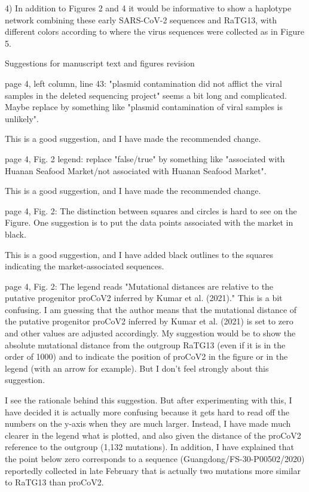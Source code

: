 \documentclass[11pt, oneside]{article}   	%
\newcommand{\response}[1]{{\color{black}#1}}
\begin{document}
4) In addition to Figures 2 and 4 it would be informative to show a haplotype network combining these early SARS-CoV-2 sequences and RaTG13, with different colors according to where the virus sequences were collected as in Figure 5.


Suggestions for manuscript text and figures revision

page 4, left column, line 43: "plasmid contamination did not afflict the viral samples in the deleted sequencing project" seems a bit long and complicated. Maybe replace by something like "plasmid contamination of viral samples is unlikely".

\response{This is a good suggestion, and I have made the recommended change.}

page 4, Fig. 2 legend: replace "false/true" by something like "associated with Huanan Seafood Market/not associated with Huanan Seafood Market".

\response{This is a good suggestion, and I have made the recommended change.}

page 4, Fig. 2: The distinction between squares and circles is hard to see on the Figure. One suggestion is to put the data points associated with the market in black.

\response{This is a good suggestion, and I have added black outlines to the squares indicating the market-associated sequences.}

page 4, Fig. 2: The legend reads "Mutational distances are relative to the putative progenitor proCoV2 inferred by Kumar et al. (2021)." This is a bit confusing. I am guessing that the author means that the mutational distance of the putative progenitor proCoV2 inferred by Kumar et al. (2021) is set to zero and other values are adjusted accordingly. My suggestion would be to show the absolute mutational distance from the outgroup RaTG13 (even if it is in the order of 1000) and to indicate the position of proCoV2 in the figure or in the legend (with an arrow for example). But I don't feel strongly about this suggestion.

\response{I see the rationale behind this suggestion. But after experimenting with this, I have decided it is actually more confusing because it gets hard to read off the numbers on the y-axis when they are much larger. Instead, I have made much clearer in the legend what is plotted, and also given the distance of the proCoV2 reference to the outgroup (1,132 mutations). In addition, I have explained that the point below zero corresponds to a sequence (Guangdong/FS-30-P00502/2020) reportedly collected in late February that is actually two mutations more similar to RaTG13 than proCoV2.}
\end{document}
